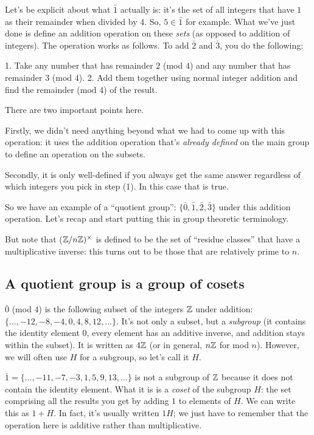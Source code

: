 Let's be explicit about what $\bar 1$ actually is: it's the set of all integers
that have $1$ as their remainder when divided by $4$. So, $5 \in \bar 1$ for
example. What we've just done is define an addition operation on these
\emph{sets} (as opposed to addition of integers). The operation works as
follows. To add $\bar 2$ and $\bar 3$, you do the following:

1. Take any number that has remainder $2$ (mod $4$) and any number that has
   remainder $3$ (mod $4$).
2. Add them together using normal integer addition and find the remainder (mod
   $4$) of the result.

There are two important points here.

Firstly, we didn't need anything beyond what we had to come up with this
operation: it uses the addition operation that's \emph{already defined} on the
main group to define an operation on the subsets.

Secondly, it is only well-defined if you always get the same answer regardless
of which integers you pick in step (1). In this case that is true.

So we have an example of a ``quotient group'': $\{\bar 0, \bar 1, \bar 2, \bar
3\}$ under this addition operation. Let's recap and start putting this in group
theoretic terminology.


But note that ($\mathbb{Z}/n\mathbb{Z})^\times$ is defined to be the set of ``residue classes​'' that have a multiplicative
inverse: this turns out to be those that are relatively prime to $n$.


\subsection{A quotient group is a group of cosets}

$\bar 0$ (mod $4$) is the following subset of the integers $\mathbb{Z}$ under addition:
$\{\ldots, -12, -8, -4, 0, 4, 8, 12, \ldots\}$. It's not only a subset, but a
\emph{subgroup} (it contains the identity element $0$, every element has an
additive inverse, and addition stays within the subset). It is written as $4\mathbb{Z}$
(or in general, $n\mathbb{Z}$ for mod $n$). However, we will often use $H$ for a
subgroup, so let's call it $H$.

$\bar 1 = \{\ldots, -11, -7, -3, 1, 5, 9, 13, \ldots\}$ is not a subgroup of
$\mathbb{Z}$ because it does not contain the identity element. What it is is a
\emph{coset} of the subgroup $H$: the set comprising all the results you get by
adding $1$ to elements of $H$. We can write this as $1 + H$. In fact, it's
usually written $1H$; we just have to remember that the operation here is
additive rather than multiplicative.

